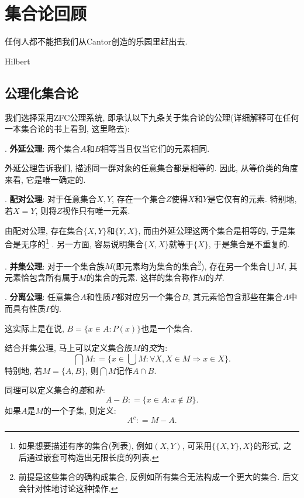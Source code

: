 \chapter{集合论回顾}

\epigraph{任何人都不能把我们从Cantor创造的乐园里赶出去. }{Hilbert}

\section{公理化集合论}

我们选择采用ZFC公理系统, 即承认以下九条关于集合论的公理(详细解释可在任何一本集合论的书上看到, 这里略去): 

\vspace{0.5em}
. \textbf{外延公理}: 两个集合$A$和$B$相等当且仅当它们的元素相同. 

外延公理告诉我们, 描述同一群对象的任意集合都是相等的. 因此, 从等价类的角度来看, 它是唯一确定的. 

\vspace{0.5em}
. \textbf{配对公理}: 对于任意集合$X, Y$, 存在一个集合$Z$使得$X$和$Y$是它仅有的元素. 特别地, 若$X=Y$, 则将$Z$视作只有唯一元素. 

由配对公理, 存在集合$\{ X, Y \}$和$\{ Y, X \}$, 而由外延公理这两个集合是相等的, 于是集合是无序的\footnote{如果想要描述有序的集合(列表), 例如$(X,Y)$, 可采用$\{ \{ X,Y \}, X \}$的形式, 之后通过嵌套可构造出无限长度的列表. } . 另一方面, 容易说明集合$\{ X, X \}$就等于$\{ X \}$, 于是集合是不重复的. 

\vspace{0.5em}
. \textbf{并集公理}: 对于一个集合族$M$(即元素均为集合的集合\footnote{前提是这些集合的确构成集合, 反例如所有集合无法构成一个更大的集合. 后文会针对性地讨论这种操作. }), 存在另一个集合$\bigcup M$, 其元素恰包含所有属于$M$的集合的元素. 这样的集合称作$M$的\textit{并}. 

\vspace{0.5em}
. \textbf{分离公理}: 任意集合$A$和性质$P$都对应另一个集合$B$, 其元素恰包含那些在集合$A$中而具有性质$P$的. 

这实际上是在说, $B=\{ x \in A :  P(x) \}$也是一个集合. 

结合并集公理, 马上可以定义集合族$M$的\textit{交}为: $$\bigcap M : = \{ x \in \bigcup M :  \forall X, X \in M \Rightarrow x \in X \}.$$
特别地, 若$M= \{ A, B \}$, 则$\bigcap M$记作$A \cap B$. 

同理可以定义集合的\textit{差}和\textit{补}: $$A - B : = \{ x \in A :  x \notin B \}.$$
如果$A$是$M$的一个子集, 则定义: $$A^c : = M - A.$$

